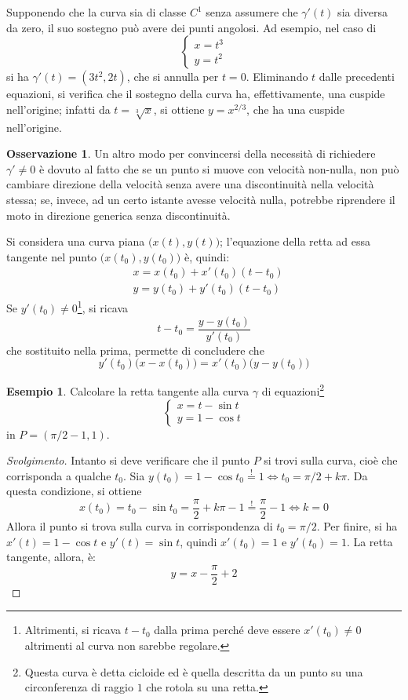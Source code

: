 \documentclass[11pt, a4paper]{scrartcl}
\newenvironment{svolgimento}{\renewcommand\qedsymbol{$\blacksquare$}\begin{proof}[Svolgimento]}{\end{proof}}
\theoremstyle{definition}
\newtheorem{esempio}{Esempio}
\numberwithin{esempio}{section}
\theoremstyle{definition}
\newtheorem{obs}{Osservazione}
\numberwithin{obs}{section}
\numberwithin{nota}{section}
\numberwithin{equation}{subsection}
\begin{document}
\noindent Supponendo che la curva sia di classe $C^1$ senza assumere che $\gamma'(t)$ sia diversa da zero, il suo sostegno pu\`o avere dei punti angolosi. 
Ad esempio, nel caso di 
\[
\begin{cases}
	x = t^3\\
	y = t^2
\end{cases}
\] 
si ha $\gamma'(t) = (3t^2 , 2t)$, che si annulla per $t= 0$.
Eliminando $t$ dalle precedenti equazioni, si verifica che il sostegno della curva ha, effettivamente, una cuspide nell'origine; infatti da $t=\sqrt[3]{x} $, si ottiene $y= x^{2  / 3} $, che ha una cuspide nell'origine.

\begin{obs}
	Un altro modo per convincersi della necessit\`a di richiedere $\gamma' \neq 0$ \`e dovuto al fatto che se un punto si muove con velocit\`a non-nulla, non pu\`o cambiare direzione della velocit\`a senza avere una discontinuit\`a nella velocit\`a stessa; se, invece, ad un certo istante avesse velocit\`a nulla, potrebbe riprendere il moto in direzione generica senza discontinuit\`a.
\end{obs}
Si considera una curva piana $\big(x(t) , y(t)\big)$; l'equazione della retta ad essa tangente nel punto $\big(x(t_0) , y(t_0)\big)$ \`e, quindi:
\[
\begin{split}
	& x = x(t_0) + x'(t_0) (t-t_0)\\
	& y= y(t_0) + y'(t_0) (t-t_0)
\end{split}
\] 
Se $y'(t_0)  \neq 0$\footnote{Altrimenti, si ricava $t-t_0$ dalla prima perch\'e deve essere $x'(t_0) \neq 0 $ altrimenti al curva non sarebbe regolare.}, si ricava 
\[
t-t_0 = \frac{y-y(t_0)}{y'(t_0)}
\] 
che sostituito nella prima, permette di concludere che
\begin{equation}
y'(t_0) \big(x-x(t_0)\big) = x'(t_0) \big(y-y(t_0)\big)
\end{equation}
\begin{esempio}
	Calcolare la retta tangente alla curva $\gamma$ di equazioni\footnote{Questa curva \`e detta cicloide ed \`e quella descritta da un punto su una circonferenza di raggio $1$ che rotola su una retta.}
\[
\begin{cases}
	x = t- \sin t\\
	y = 1- \cos t
\end{cases}
\] 
in $P = (\pi / 2 - 1 , 1)$.
\begin{svolgimento}
	Intanto si deve verificare che il punto $P$ si trovi sulla curva, cio\`e che corrisponda a qualche $t_0$.
	Sia $y(t_0) = 1- \cos t_0 \stackrel{!}{=} 1\iff t_0 = \pi/2 + k\pi$. 
	Da questa condizione, si ottiene
	\[
	x(t_0) = t_0 - \sin t_0 = \frac{\pi}{2} + k\pi - 1 \stackrel{!}{=} \frac{\pi}{2}-1 \iff k=0
	\] 
	Allora il punto si trova sulla curva in corrispondenza di $t_0 = \pi / 2$.
	Per finire, si ha $x'(t) = 1 - \cos t$ e $y'(t) = \sin t$, quindi $x'(t_0) = 1$ e $y'(t_0) = 1$. 
La retta tangente, allora, \`e:
\[
y = x - \frac{\pi}{2} + 2
\] 

\end{svolgimento}
\end{esempio}
\end{document}
